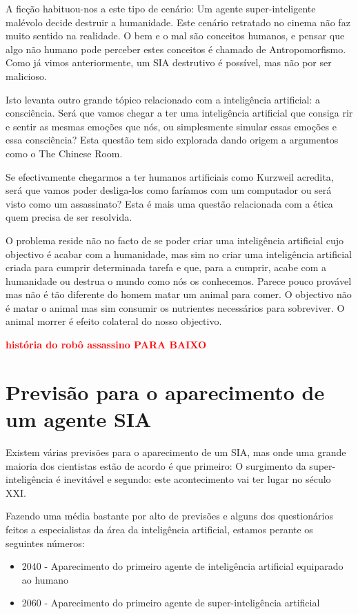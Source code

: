 \documentclass[runningheads,a4paper]{llncs}
\begin{document}
A ficção habituou-nos a este tipo de cenário: Um agente super-inteligente malévolo decide destruir a humanidade. Este cenário retratado no cinema não faz muito sentido na realidade. O bem e o mal são conceitos humanos, e pensar que algo não humano pode perceber estes conceitos é chamado de Antropomorfismo. Como já vimos anteriormente, um SIA destrutivo é possível, mas não por ser malicioso.

Isto levanta outro grande tópico relacionado com a inteligência artificial: a consciência. Será que vamos chegar a ter uma inteligência artificial que consiga rir e sentir as mesmas emoções que nós, ou simplesmente simular essas emoções e essa consciência? Esta questão tem sido explorada dando origem a argumentos como o The Chinese Room\cite{chineseroom}.

Se efectivamente chegarmos a ter humanos artificiais como Kurzweil acredita, será que vamos poder desliga-los como faríamos com um computador ou será visto como um assassinato? Esta é mais uma questão relacionada com a ética quem precisa de ser resolvida.

O problema reside não no facto de se poder criar uma inteligência artificial cujo objectivo é acabar com a humanidade, mas sim no criar uma inteligência artificial criada para cumprir determinada tarefa e que, para a cumprir, acabe com a humanidade ou destrua o mundo como nós os conhecemos. Parece pouco provável mas não é tão diferente do homem matar um animal para comer. O objectivo não é matar o animal mas sim consumir os nutrientes necessários para sobreviver. O animal morrer é efeito colateral do nosso objectivo.

\textcolor{red}{\textbf{história do robô assassino PARA BAIXO}}

\section{Previsão para o aparecimento de um agente SIA}

Existem várias previsões para o aparecimento de um SIA, mas onde uma grande maioria dos cientistas estão de acordo é que primeiro: O surgimento da super-inteligência é inevitável e segundo: este acontecimento vai ter lugar no século XXI\@.

Fazendo uma média bastante por alto de previsões e alguns dos questionários feitos a especialistas da área da inteligência artificial, estamos perante os seguintes números:

\begin{itemize}

  \item 2040 - Aparecimento do primeiro agente de inteligência artificial equiparado ao humano
  \item 2060 - Aparecimento do primeiro agente de super-inteligência artificial

\end{itemize}
\end{document}
